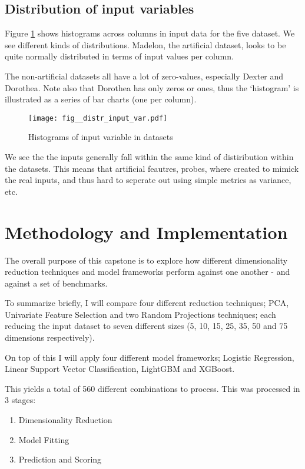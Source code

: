 \documentclass[12pt]{article}
\begin{document}
\subsection{Distribution of input variables}

Figure \ref{fig:distr_input_var} shows histograms across columns in input data for the five dataset. We see different kinds of distributions. Madelon, the artificial dataset, looks to be quite normally distributed in terms of input values per column.

The non-artificial datasets all have a lot of zero-values, especially Dexter and Dorothea. Note also that Dorothea has only zeros or ones, thus the `histogram' is illustrated as a series of bar charts (one per column).

\begin{figure}[h]
  \begin{center}
    \texttt{[image: fig\_\_distr\_input\_var.pdf]}
    \caption{\label{fig:distr_input_var} Histograms of input variable in datasets}
  \end{center}
\end{figure}

We see the the inputs generally fall within the same kind of distiribution within the datasets. This means that artificial feautres, probes, where created to mimick the real inputs, and thus hard to seperate out using simple metrics as variance, etc.


\section{Methodology and Implementation}

The overall purpose of this capstone is to explore how different dimensionality reduction techniques and model frameworks perform against one another - and against a set of benchmarks. 

To summarize briefly, I will compare four different reduction techniques; PCA, Univariate Feature Selection and two Random Projections techniques; each reducing the input dataset to seven different sizes (5, 10, 15, 25, 35, 50 and 75 dimensions respectively). 

On top of this I will apply four different model frameworks; Logistic Regression, Linear Support Vector Classification, LightGBM and XGBoost.

This yields a total of 560 different combinations to process. This was processed in 3 stages:

\begin{enumerate}
	\item Dimensionality Reduction  
	\item Model Fitting
	\item Prediction and Scoring
\end{enumerate}
\end{document}
